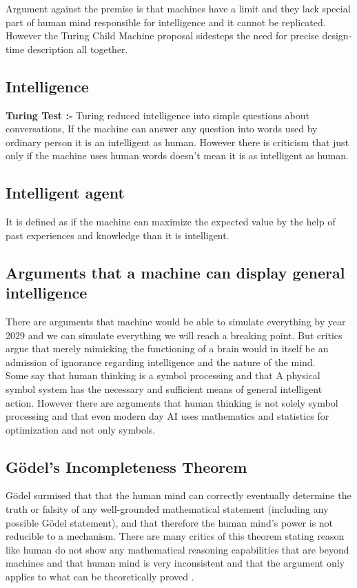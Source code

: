 \documentclass{article}
\begin{document}
Argument against the premise is that machines have a limit and they lack special part of human mind responsible for intelligence and it cannot be replicated.
However the Turing Child Machine proposal sidesteps the need for precise design-time description all together. 
\subsection{Intelligence} 
\textbf {Turing Test :-}
Turing reduced  intelligence into simple questions about conversations, If the machine can answer any question into words used by ordinary person it is an intelligent as human. However there is criticism that just only if the machine uses human words doesn’t mean it is as intelligent as human. 
\subsection{Intelligent agent}

It is defined as if the machine can maximize the expected value by the help of past experiences and knowledge than it is intelligent.
\subsection{Arguments that a machine can display general intelligence}


There are arguments that machine would be able to simulate everything by year 2029 and we can simulate everything we will reach a breaking point. But critics argue that merely mimicking the functioning of a brain would in itself be an admission of ignorance regarding intelligence and the nature of the mind. \\
Some say that human thinking is a  symbol processing and that A physical symbol system has the necessary and sufficient means of general intelligent action. However there are arguments that human thinking is not solely symbol processing and that even modern day AI uses mathematics and statistics for optimization and not only symbols. \\
\subsection{Gödel’s Incompleteness Theorem} 
Gödel surmised that that the human mind can correctly eventually determine the truth or falsity of any well-grounded mathematical statement (including any possible Gödel statement), and that therefore the human mind's power is not reducible to a mechanism.   
There are many critics of this theorem stating reason like human do not show any mathematical reasoning capabilities that are beyond machines and that human mind is very inconsistent and that the argument only applies to what can be theoretically proved  .
\end{document}
